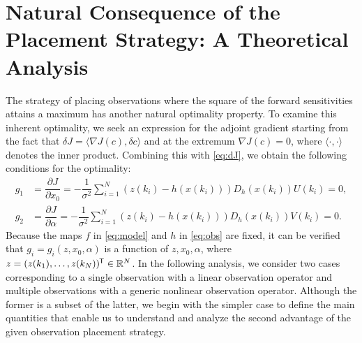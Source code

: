 \documentclass{article}
\newcommand*{\tran}{^{\mkern-1.5mu\mathsf{T}}}
\begin{document}
\section{Natural Consequence of the Placement Strategy: A Theoretical Analysis} \label{sec:dual}
The strategy of placing observations where the square of the forward sensitivities attains a maximum has another natural optimality property. To examine this inherent optimality, we seek an expression for the adjoint gradient starting from the fact that $\delta J = \langle \nabla J(c) , \delta c \rangle$ and at the extremum $\nabla J(c)=0$, where $\langle \cdot , \cdot \rangle$ denotes the inner product. Combining this with \cref{eq:dJ}, we obtain the following conditions for the optimality:
\begin{align}
    g_1 &= \dfrac{\partial J}{\partial x_0} = -\dfrac{1}{\sigma^2} \sum_{i=1}^{N} (z(k_i) - h(x(k_i))) D_h(x(k_i)) U(k_i) = 0, \label{eq:opt1} \\
    g_2 &= \dfrac{\partial J}{\partial \alpha} = -\dfrac{1}{\sigma^2} \sum_{i=1}^{N} (z(k_i) - h(x(k_i))) D_h(x(k_i)) V(k_i) = 0. \label{eq:opt2}
\end{align}
Because the maps $f$ in \cref{eq:model} and $h$ in \cref{eq:obs} are fixed, it can be verified that $g_i = g_i(z,x_0,\alpha)$ is a function of $z,x_0,\alpha$, where $z = (z(k_1), \dots, z(k_N))\tran \in \mathbb{R}^N$. In the following analysis, we consider two cases corresponding to a single observation with a linear observation operator and multiple observations with a generic nonlinear observation operator. Although the former is a subset of the latter, we begin with the simpler case to define the main quantities that enable us to understand and analyze the second advantage of the given observation placement strategy.

\end{document}
